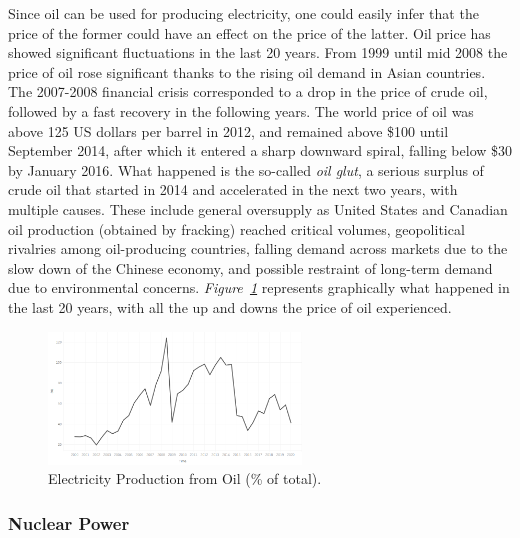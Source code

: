 \documentclass[a4paper,12pt]{book}
\begin{document}
Since oil can be used for producing electricity, one could easily infer that the price of the former could have an effect on the price of the latter. Oil price has showed significant fluctuations in the last 20 years. From 1999 until mid 2008 the price of oil rose significant thanks to the rising oil demand in Asian countries. The 2007-2008 financial crisis corresponded to a drop in the price of crude oil, followed by a fast recovery in the following years. The world price of oil was above 125 US dollars per barrel in 2012, and remained above \$100 until September 2014, after which it entered a sharp downward spiral, falling below \$30 by January 2016. What happened is the so-called \textit{oil glut}, a serious surplus of crude oil that started in 2014 and accelerated in the next two years, with multiple causes. These include general oversupply as United States and Canadian oil production (obtained by fracking) reached critical volumes, geopolitical rivalries among oil-producing countries, falling demand across markets due to the slow down of the Chinese economy, and possible restraint of long-term demand due to environmental concerns. \textit{Figure~\ref{fig:oilbeh}} represents graphically what happened in the last 20 years, with all the up and downs the price of oil experienced.

\begin{figure}[tb]
\begin{center}
\captionsetup{justification=centering}
\includegraphics[width=0.6\textwidth]{Images/oilbeh.png}
\caption{Electricity Production from Oil (\% of total). }
\label{fig:oilbeh}
\end{center}
\end{figure}

\subsubsection*{Nuclear Power}
\end{document}
